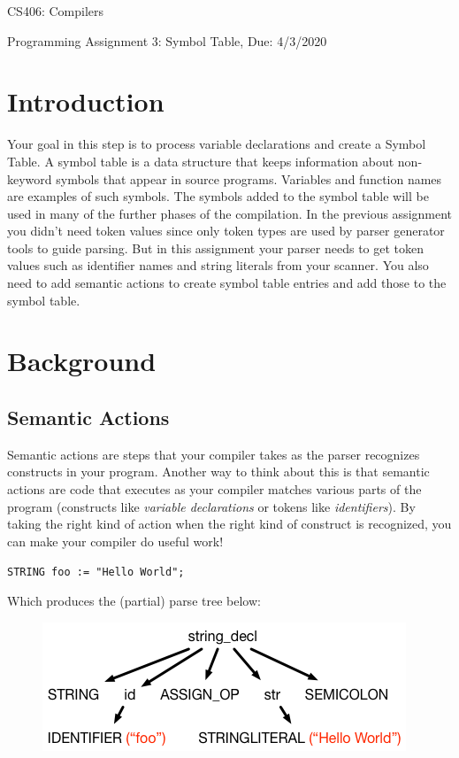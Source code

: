 \documentclass{article}
\begin{document}
\begin{center}{\LARGE CS406: Compilers} \end{center}
\begin{center}{\large Programming Assignment 3: Symbol Table,  Due: 4/3/2020} \end{center}

\bigskip



\section{Introduction}
Your goal in this step is to process variable declarations and create a Symbol Table. 
A symbol table is a data structure that keeps information about non-keyword symbols that appear in source programs. 
Variables and function names are examples of such symbols. 
The symbols added to the symbol table will be used in many of the further phases of the compilation.
In the previous assignment you didn't need token values since only token types are used by parser generator tools to guide parsing. 
But in this assignment your parser needs to get token values such as identifier names and string literals from your scanner. 
You also need to add semantic actions to create symbol table entries and add those to the symbol table.


\section{Background}
\subsection{Semantic Actions}
Semantic actions are steps that your compiler takes as the parser recognizes constructs in your program. 
Another way to think about this is that semantic actions are code that executes as your compiler matches various parts of the program (constructs like {\em variable declarations} or tokens like {\em identifiers}). 
By taking the right kind of action when the right kind of construct is recognized, you can make your compiler do useful work!

\texttt{STRING foo := "Hello World";}

Which produces the (partial) parse tree below:

\begin{figure}[H]
	\includegraphics[scale=0.5]{parsetree}
\end{figure}
\end{document}
